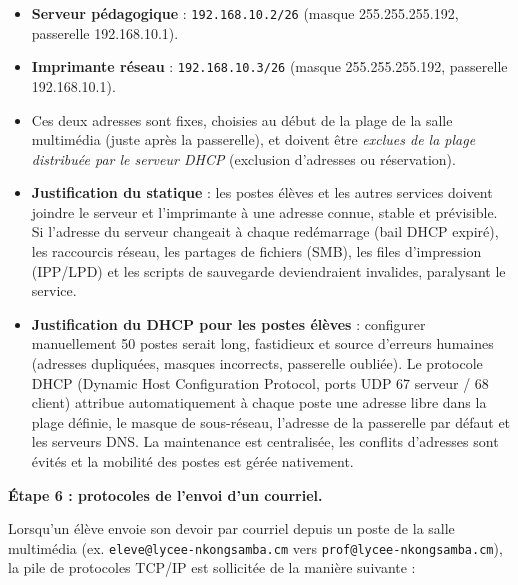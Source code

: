 \documentclass[11pt]{article}
\newcommand{\cle}[1]{{\popxbold\color{popdark}#1}}
\begin{document}
\begin{exoresolu}
\begin{itemize}
\item \textbf{Serveur pédagogique} : \texttt{192.168.10.2/26} (masque 255.255.255.192, passerelle 192.168.10.1).
\item \textbf{Imprimante réseau} : \texttt{192.168.10.3/26} (masque 255.255.255.192, passerelle 192.168.10.1).
\item Ces deux adresses sont fixes, choisies au début de la plage de la salle multimédia (juste après la passerelle), et doivent être \emph{exclues de la plage distribuée par le serveur DHCP} (exclusion d'adresses ou réservation).
\item \textbf{Justification du statique} : les postes élèves et les autres services doivent joindre le serveur et l'imprimante à une adresse connue, stable et prévisible. Si l'adresse du serveur changeait à chaque redémarrage (bail DHCP expiré), les raccourcis réseau, les partages de fichiers (SMB), les files d'impression (IPP/LPD) et les scripts de sauvegarde deviendraient invalides, paralysant le service.
\item \textbf{Justification du DHCP pour les postes élèves} : configurer manuellement 50 postes serait long, fastidieux et source d'erreurs humaines (adresses dupliquées, masques incorrects, passerelle oubliée). Le protocole \cle{DHCP} (Dynamic Host Configuration Protocol, ports UDP 67 serveur / 68 client) attribue automatiquement à chaque poste une adresse libre dans la plage définie, le masque de sous-réseau, l'adresse de la passerelle par défaut et les serveurs DNS. La maintenance est centralisée, les conflits d'adresses sont évités et la mobilité des postes est gérée nativement.
\end{itemize}

\textbf{Étape 6 : protocoles de l'envoi d'un courriel.}

Lorsqu'un élève envoie son devoir par courriel depuis un poste de la salle multimédia (ex. \texttt{eleve@lycee-nkongsamba.cm} vers \texttt{prof@lycee-nkongsamba.cm}), la pile de protocoles TCP/IP est sollicitée de la manière suivante :


\end{exoresolu}
\end{document}
